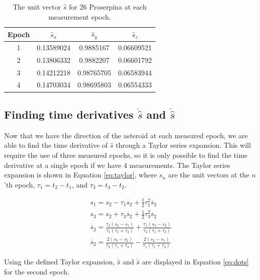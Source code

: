 \documentclass{article}
\begin{document}
\begin{table}[H]
\centering
\begin{tabular}{|c|c|c|c|}
    \hline 
    \textbf{Epoch} & \textbf{$\hat{s}_{x}$} & \textbf{$\hat{s}_{y}$} & \textbf{$\hat{s}_{z}$} \\
    \hline
    1 & 0.13589024 & 0.9885167 & 0.06609521 \\
    \hline
    2 & 0.13806332 & 0.9882207 & 0.06601792 \\
    \hline
    3 & 0.14212218 & 0.98765705 & 0.06583944 \\
    \hline
    4 & 0.14703034 & 0.98695803 & 0.06554333 \\
    \hline
\end{tabular}
    \caption{The unit vector $\hat{s}$ for 26 Proserpina at each measurement epoch.}
    \label{tab:unit_vector}
\end{table}

\subsection{Finding time derivatives $\dot{\hat{s}}$ and $\ddot{\hat{s}}$}

Now that we have the direction of the asteroid at each measured epoch, we are able to find the time derivative of $\hat{s}$ through a 
Taylor series expansion. This will require the use of three measured epochs, so it is only possible to find the time derivative at a single epoch if we have 4 measurements.
The Taylor series expansion is shown in Equation \ref{eq:taylor}, where $s_n$ are the unit vectors at the $n$'th epoch, $\tau_1 = t_2 - t_1$, 
and $\tau_3 = t_3 - t_2$.

\begin{equation}
    \begin{aligned}
        s_1 = s_2 - \tau_1\dot{s_2} + \frac{1}{2}\tau_1^2\ddot{s_2} \\
        s_3 = s_2 + \tau_3\dot{s_2} + \frac{1}{2}\tau_3^2\ddot{s_2} \\
        \dot{s_2} = \frac{\tau_3(s_2-s_1)}{\tau_1(\tau_1 + \tau_3)} + \frac{\tau_1(s_3-s_2)}{\tau_3(\tau_1 + \tau_3)} \\
        \ddot{s_2} = \frac{2(s_3-s_2)}{\tau_3(\tau_1 + \tau_3)} - \frac{2(s_2-s_1)}{\tau_1(\tau_1 + \tau_3)}
    \end{aligned}
    \label{eq:taylor}
\end{equation}

\noindent
Using the defined Taylor expansion, $\dot{\hat{s}}$ and $\ddot{\hat{s}}$ are displayed in Equation \ref{eq:dots} for the second epoch.
\end{document}
